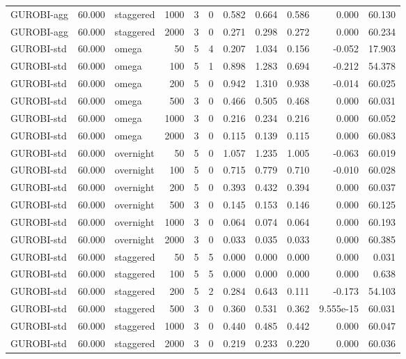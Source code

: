\begin{table}[htbp]
\begin{tabular}{lrlrrlrrrrr}
GUROBI-agg & 60.000 & staggered & 1000 & 3 & 0 & 0.582 & 0.664 & 0.586 & 0.000 & 60.130 \\
GUROBI-agg & 60.000 & staggered & 2000 & 3 & 0 & 0.271 & 0.298 & 0.272 & 0.000 & 60.234 \\
GUROBI-std & 60.000 & omega & 50 & 5 & 4 & 0.207 & 1.034 & 0.156 & -0.052 & 17.903 \\
GUROBI-std & 60.000 & omega & 100 & 5 & 1 & 0.898 & 1.283 & 0.694 & -0.212 & 54.378 \\
GUROBI-std & 60.000 & omega & 200 & 5 & 0 & 0.942 & 1.310 & 0.938 & -0.014 & 60.025 \\
GUROBI-std & 60.000 & omega & 500 & 3 & 0 & 0.466 & 0.505 & 0.468 & 0.000 & 60.031 \\
GUROBI-std & 60.000 & omega & 1000 & 3 & 0 & 0.216 & 0.234 & 0.216 & 0.000 & 60.052 \\
GUROBI-std & 60.000 & omega & 2000 & 3 & 0 & 0.115 & 0.139 & 0.115 & 0.000 & 60.083 \\
GUROBI-std & 60.000 & overnight & 50 & 5 & 0 & 1.057 & 1.235 & 1.005 & -0.063 & 60.019 \\
GUROBI-std & 60.000 & overnight & 100 & 5 & 0 & 0.715 & 0.779 & 0.710 & -0.010 & 60.028 \\
GUROBI-std & 60.000 & overnight & 200 & 5 & 0 & 0.393 & 0.432 & 0.394 & 0.000 & 60.037 \\
GUROBI-std & 60.000 & overnight & 500 & 3 & 0 & 0.145 & 0.153 & 0.146 & 0.000 & 60.125 \\
GUROBI-std & 60.000 & overnight & 1000 & 3 & 0 & 0.064 & 0.074 & 0.064 & 0.000 & 60.193 \\
GUROBI-std & 60.000 & overnight & 2000 & 3 & 0 & 0.033 & 0.035 & 0.033 & 0.000 & 60.385 \\
GUROBI-std & 60.000 & staggered & 50 & 5 & 5 & 0.000 & 0.000 & 0.000 & 0.000 & 0.031 \\
GUROBI-std & 60.000 & staggered & 100 & 5 & 5 & 0.000 & 0.000 & 0.000 & 0.000 & 0.638 \\
GUROBI-std & 60.000 & staggered & 200 & 5 & 2 & 0.284 & 0.643 & 0.111 & -0.173 & 54.103 \\
GUROBI-std & 60.000 & staggered & 500 & 3 & 0 & 0.360 & 0.531 & 0.362 & 9.555e-15 & 60.031 \\
GUROBI-std & 60.000 & staggered & 1000 & 3 & 0 & 0.440 & 0.485 & 0.442 & 0.000 & 60.047 \\
GUROBI-std & 60.000 & staggered & 2000 & 3 & 0 & 0.219 & 0.233 & 0.220 & 0.000 & 60.036 \\
\bottomrule
\end{tabular}
\end{table}
